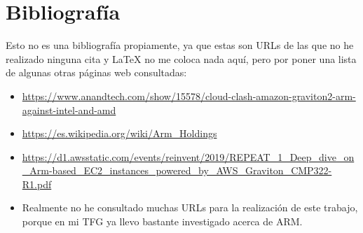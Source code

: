 \documentclass[a4paper,openright,12pt]{article}
\begin{document}
\section{Bibliografía}
Esto no es una bibliografía propiamente, ya que estas son URLs de las que no he realizado ninguna cita y \LaTeX{} no me coloca nada aquí, pero por poner una lista
de algunas otras páginas web consultadas:
\begin{itemize}
    \item \url{https://www.anandtech.com/show/15578/cloud-clash-amazon-graviton2-arm-against-intel-and-amd}
    \item \url{https://es.wikipedia.org/wiki/Arm_Holdings}
    \item \url{https://d1.awsstatic.com/events/reinvent/2019/REPEAT_1_Deep_dive_on_Arm-based_EC2_instances_powered_by_AWS_Graviton_CMP322-R1.pdf}
    \item Realmente no he consultado muchas URLs para la realización de este trabajo, porque en mi TFG ya llevo bastante investigado acerca de ARM.
\end{itemize}

\begin{flushleft}
\printbibliography[]{}
\end{flushleft}
\end{document}

